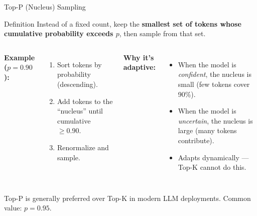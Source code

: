 \documentclass{beamer}
\begin{document}
\begin{frame}{Top-P (Nucleus) Sampling}
    \begin{block}{Definition}
        Instead of a fixed count, keep the \textbf{smallest set of tokens whose cumulative
        probability exceeds $p$}, then sample from that set.
    \end{block}

    \vspace{0.2cm}
    \begin{columns}
        \textbf{Example ($p = 0.90$):}
        \begin{enumerate}
            \item Sort tokens by probability (descending).
            \item Add tokens to the ``nucleus'' until cumulative $\geq 0.90$.
            \item Renormalize and sample.
        \end{enumerate}

        \textbf{Why it's adaptive:}
        \begin{itemize}
            \item When the model is \emph{confident}, the nucleus is small (few tokens cover 90\%).
            \item When the model is \emph{uncertain}, the nucleus is large (many tokens contribute).
            \item Adapts dynamically --- Top-K cannot do this.
        \end{itemize}
    \end{columns}

    \vspace{0.1cm}
    \begin{alertblock}{}
        Top-P is generally preferred over Top-K in modern LLM deployments.
        Common value: $p = 0.95$.
    \end{alertblock}
\end{frame}
\end{document}

